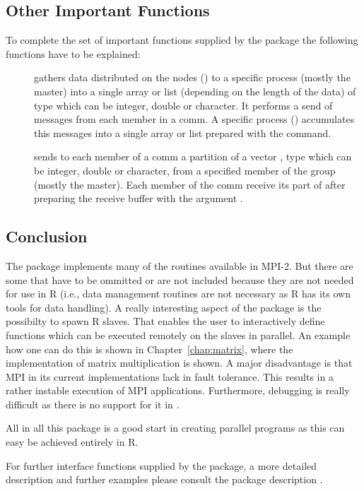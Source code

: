 \subsection{Other Important Functions}

To complete the set of important functions supplied by the 
package the following functions have to be explained:

\begin{description}
\item[] gathers
  data distributed on the nodes () to a 
  specific process (mostly the master) into a single array or list
  (depending on the length of the data) of type  which can
  be integer, double or character. It
  performs  
  a send of messages from each member in a comm. A
  specific process () accumulates this messages into a 
  single array or list prepared with the  command.
\item[]
  sends to each member of a comm a partition of  a vector ,
  type  which can be integer, double or character,
  from a specified member of the group (mostly the master). Each
  member of the comm receive its part of  after preparing the
  receive buffer with the argument .
\end{description}

\subsection{Conclusion}

The package  implements many of the routines available in
MPI-2. But there are some that have to be ommitted or are not included
because they are not needed for use in R (i.e., data management
routines are not necessary as R has its own tools for data handling).
A really interesting aspect of the  package is the
possibilty to spawn R slaves. That enables the user to interactively
define functions which can be executed remotely on the slaves in
parallel. An example how one can do this is shown in
Chapter~\ref{chap:matrix}, where the implementation of matrix
multiplication is shown. A major disadvantage is that MPI in its
current implementations lack in fault tolerance. This results in a
rather instable execution of MPI applications. Furthermore, debugging
is really difficult as there is no support for it in .

All in all this package is a good start in creating parallel programs
as this can easy be achieved entirely in R.

For further interface functions supplied by the  package, a
more detailed description and further examples please consult the
package description \cite{yu06Rmpi}.
